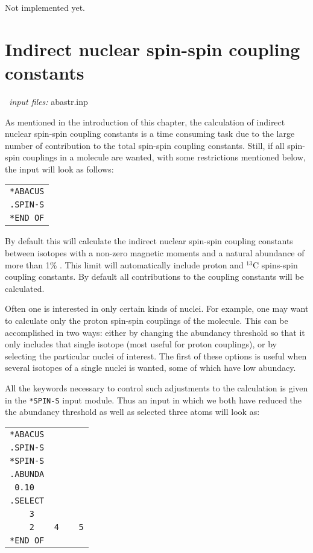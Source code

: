 Not implemented yet.

\section{Indirect nuclear spin-spin coupling
constants}\label{sec:spinspin}

{\it \aba\ input files:} abastr.inp

\bigskip

As mentioned in the introduction of this chapter, the calculation of indirect nuclear
spin-spin coupling constants is a time consuming task due to the
large number of contribution to the total spin-spin coupling
constants. Still, if all spin-spin couplings in a molecule are wanted,
with some restrictions mentioned below, the input will look as
follows:

\smallskip

\begin{tabular}{l}
\verb|*ABACUS|\\
\verb|.SPIN-S|\\
\verb|*END OF|
\end{tabular}

\smallskip

By default this will calculate the indirect nuclear spin-spin coupling
constants between isotopes with a non-zero magnetic moments and a
natural abundance of more than 1\% . This limit will automatically
include proton and $^{13}$C spins-spin coupling constants. By default
all contributions to the coupling constants will be calculated. 

Often one is interested in only certain kinds of nuclei. For example,
 one may want to calculate only the proton spin-spin couplings of the molecule.
This can be accomplished in two ways: either by changing the abundancy
threshold so that it only includes that single isotope (most useful
for proton couplings), or by selecting the particular nuclei of interest. The
first of these options is useful when several isotopes of a single
nuclei is wanted, some of which have low abundacy.

All the keywords necessary to control such adjustments to the
calculation is given in the \verb|*SPIN-S| input module. Thus an input
in which we both have reduced the the abundancy threshold as well as
selected three atoms will look as:

\smallskip

\begin{tabular}{l}
\verb|*ABACUS|\\
\verb|.SPIN-S|\\
\verb|*SPIN-S|\\
\verb|.ABUNDA|\\
\verb| 0.10|\\
\verb|.SELECT|\\
\verb|    3  |\\
\verb|    2    4    5|\\
\verb|*END OF|
\end{tabular}

